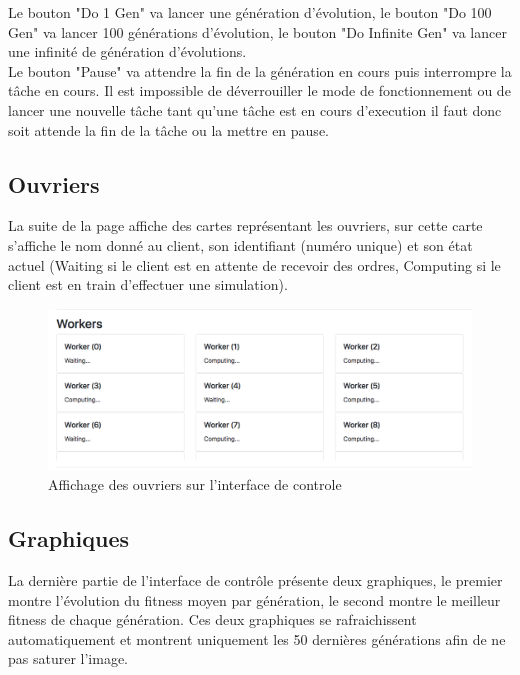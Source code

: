 \documentclass{article}
\begin{document}
Le bouton "Do 1 Gen" va lancer une génération d'évolution, le bouton "Do 100 Gen" va lancer 100 générations d'évolution, le bouton "Do Infinite Gen" va lancer une infinité de génération d'évolutions.\\

Le bouton "Pause" va attendre la fin de la génération en cours puis interrompre la tâche en cours. Il est impossible de déverrouiller le mode de fonctionnement ou de lancer une nouvelle tâche tant qu'une tâche est en cours d'execution il faut donc soit attende la fin de la tâche ou la mettre en pause.

\subsection{Ouvriers}

La suite de la page affiche des cartes représentant les ouvriers, sur cette carte s'affiche le nom donné au client, son identifiant (numéro unique) et son état actuel (Waiting si le client est en attente de recevoir des ordres, Computing si le client est en train d'effectuer une simulation).

\begin{figure}[H]
\begin{center}
	\includegraphics[scale=0.4]{workers.png} 
	\caption{Affichage des ouvriers sur l'interface de controle}
\end{center}
\end{figure}


\subsection{Graphiques}

La dernière partie de l'interface de contrôle présente deux graphiques, le premier montre l'évolution du fitness moyen par génération, le second montre le meilleur fitness de chaque génération. Ces deux graphiques se rafraichissent automatiquement et montrent uniquement les 50 dernières générations afin de ne pas saturer l'image.
\end{document}
